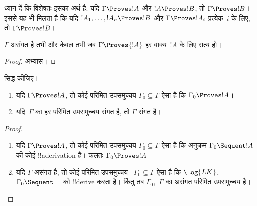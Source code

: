 \documentclass[../../../include/open-logic-section]{subfiles}
\begin{document}
ध्यान दें कि विशेषतः इसका अर्थ है: यदि $\Gamma \Proves !A$ और $!A
\Proves !B$, तो $\Gamma \Proves !B$। इससे यह भी मिलता है कि यदि $!A_1,
\dots, !A_n \Proves !B$ और $\Gamma \Proves !A_i$ प्रत्येक~$i$ के लिए, तो
$\Gamma \Proves !B$।

\begin{prop}
$\Gamma$ असंगत है तभी और केवल तभी जब $\Gamma \Proves {!A}$ हर
  वाक्य~$!A$ के लिए सत्य हो।
\end{prop}

\begin{proof}
अभ्यास।
\end{proof}

\begin{prob}
 सिद्ध कीजिए।
\end{prob}

\begin{prop}[संहतता]
  \begin{enumerate}
  \item यदि $\Gamma \Proves !A$, तो कोई परिमित उपसमुच्चय $\Gamma_0
    \subseteq \Gamma$ ऐसा है कि $\Gamma_0 \Proves !A$।
  \item यदि~$\Gamma$ का हर परिमित उपसमुच्चय संगत है, तो $\Gamma$ संगत है।
  \end{enumerate}
\end{prop}

\begin{proof}
  \begin{enumerate}
    \item यदि $\Gamma \Proves !A$, तो कोई परिमित उपसमुच्चय
      $\Gamma_0 \subseteq \Gamma$ ऐसा है कि अनुक्रम $\Gamma_0
      \Sequent !A$ की कोई !!a{derivation} है। फलतः $\Gamma_0
      \Proves !A$।
    \item यदि $\Gamma$ असंगत है, तो कोई परिमित उपसमुच्चय
      ~$\Gamma_0 \subseteq \Gamma$ ऐसा है कि $\Log{LK}$, $\Gamma_0 \Sequent \quad$
      को !!{derive} करता है। किंतु तब $\Gamma_0$,~$\Gamma$ का असंगत परिमित
      उपसमुच्चय है।
  \end{enumerate}
\end{proof}
\end{document}
